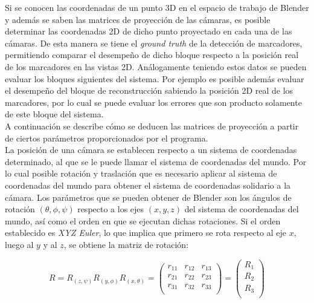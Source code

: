 Si se conocen las coordenadas de un punto 3D en el espacio de trabajo de Blender y además se saben las matrices de proyección de las cámaras, es posible determinar las coordenadas 2D de dicho punto proyectado en cada una de las cámaras. De esta manera se tiene el \textit{ground truth} de la detección de marcadores, permitiendo comparar el desempeño de dicho bloque respecto  a la posición real de los marcadores en las vistas 2D. Análogamente teniendo estos datos se pueden evaluar los bloques siguientes del sistema. Por ejemplo es posible además evaluar el desempeño del bloque de reconstrucción sabiendo la posición 2D real de los marcadores, por lo cual se puede evaluar los errores que son producto solamente de este bloque del sistema.\\

A continuación se describe cómo se deducen las matrices de proyección a partir de ciertos parámetros proporcionados por el programa.\\

La posición de una cámara se establecen respecto a un sistema de coordenadas determinado, al que se le puede llamar el sistema de coordenadas del mundo. Por lo cual posible rotación y traslación que es necesario aplicar al sistema de coordenadas del mundo para obtener el sistema de coordenadas solidario a la cámara. Los parámetros que se pueden obtener de Blender son los ángulos de rotación $(\theta, \phi, \psi )$ respecto a los ejes $(x,y, z)$ del sistema de coordenadas del mundo, así como el orden en que se ejecutan dichas rotaciones. Si el orden establecido es \textit{XYZ Euler}, lo que implica que primero se rota respecto al eje $x$, luego al $y$ y al $z$, se obtiene la matriz de rotación:

\[R=R_{(z,\psi)}R_{(y,\phi)}R_{(x,\theta)}
= \begin{pmatrix}
		r_{11} & r_{12} & r_{13}\\
		r_{21} & r_{22} & r_{23}\\
		r_{31} & r_{32} & r_{33}\\ 
\end{pmatrix}= 
\begin{pmatrix}
			R_1 \\
			R_2 \\
			R_3 \\
		\end{pmatrix}
\]
 
